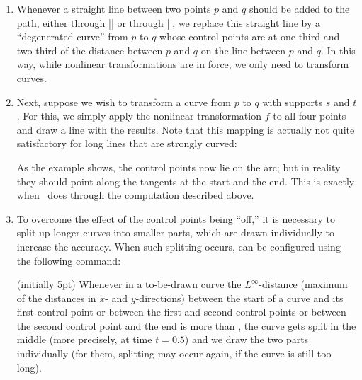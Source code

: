 \begin{enumerate}
\item Whenever a straight line between two points $p$ and $q$ should
  be added to the path, either through |\pgfpathlineto| or through
  |\pgfpathclose|, we replace this straight line by a ``degenerated
  curve'' from $p$ to $q$ whose control points are at one third and
  two third of the distance between $p$ and $q$ on the line between
  $p$ and $q$. In this way, while nonlinear transformations are in
  force, we only need to transform curves.
\item Next, suppose we wish to transform a curve from $p$ to $q$ with
  supports $s$ and $t$. For this, we simply apply the nonlinear
  transformation $f$ to all four points and draw a line with the
  results. Note that this mapping is actually not quite satisfactory
  for long lines that are strongly curved:
\begin{codeexample}[]
\end{codeexample}
  As the example shows, the control points now lie on the arc; but in
  reality they should point along the tangents at the start and the
  end. This is exactly when \pgfname\ does through the computation
  described above.
\item
  To overcome the effect of the control points being ``off,'' it is
  necessary to split up longer curves into smaller parts, which are
  drawn individually to increase the accuracy. When such splitting
  occurs, can be configured using the following command:
  \begin{command}{\pgfsettransformnonlinearflatness{}
      (initially 5pt)}
    Whenever in a to-be-drawn curve the $L^\infty$-distance (maximum
    of the distances in $x$- and $y$-directions) between the start of
    a curve and its first control point or between the first and
    second control points or between the second control point and the
    end is more than , the curve gets split in the
    middle (more precisely, at time $t= 0.5$) and we draw the two
    parts individually (for them, splitting may occur again, if the
    curve is still too long).
\begin{codeexample}[]
\end{codeexample}
  \end{command}
\end{enumerate}


